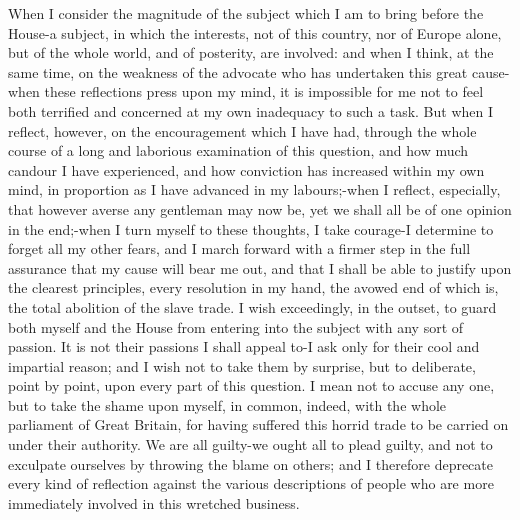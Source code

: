 \documentclass[a4paper]{amsbook}
\begin{document}
\vspace{10 mm}

When I consider the magnitude of the subject which I am to bring before the House-a subject, in which the interests, not of this country, nor of Europe alone, but of the whole world, and of posterity, are involved: and when I think, at the same time, on the weakness of the advocate who has undertaken this great cause-when these reflections press upon my mind, it is impossible for me not to feel both terrified and concerned at my own inadequacy to such a task. But when I reflect, however, on the encouragement which I have had, through the whole course of a long and laborious examination of this question, and how much candour I have experienced, and how conviction has increased within my own mind, in proportion as I have advanced in my labours;-when I reflect, especially, that however averse any gentleman may now be, yet we shall all be of one opinion in the end;-when I turn myself to these thoughts, I take courage-I determine to forget all my other fears, and I march forward with a firmer step in the full assurance that my cause will bear me out, and that I shall be able to justify upon the clearest principles, every resolution in my hand, the avowed end of which is, the total abolition of the slave trade. I wish exceedingly, in the outset, to guard both myself and the House from entering into the subject with any sort of passion. It is not their passions I shall appeal to-I ask only for their cool and impartial reason; and I wish not to take them by surprise, but to deliberate, point by point, upon every part of this question. I mean not to accuse any one, but to take the shame upon myself, in common, indeed, with the whole parliament of Great Britain, for having suffered this horrid trade to be carried on under their authority. We are all guilty-we ought all to plead guilty, and not to exculpate ourselves by throwing the blame on others; and I therefore deprecate every kind of reflection against the various descriptions of people who are more immediately involved in this wretched business.
\end{document}
